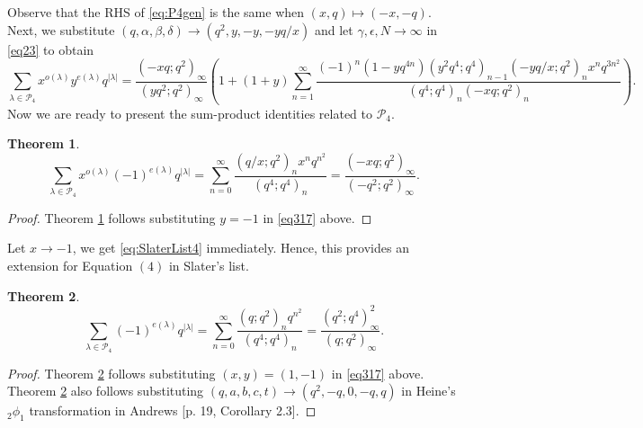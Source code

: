 \documentclass[12pt]{amsart}
\newtheorem{theorem}{Theorem}[section]
\theoremstyle{definition}
\theoremstyle{remark}
\numberwithin{equation}{section}
\begin{document}
Observe that the RHS of \eqref{eq:P4gen} is the same when $(x,q)\mapsto (-x,-q)$. 
Next, we substitute $(q,\alpha,\beta,\delta)\rightarrow (q^2,y,-y,-yq/x)$ and let $\gamma,\epsilon,N\longrightarrow\infty$ in \eqref{eq23} to obtain 
\begin{equation}\label{eq317}
\sum_{\lambda\in\mathcal{P}_4}x^{o(\lambda)}y^{e(\lambda)}q^{|\lambda|}=\frac{(-xq;q^2)_{\infty}}{(yq^2;q^2)_{\infty}}\left(1+(1+y)\sum\limits_{n=1}^{\infty}\frac{(-1)^n(1-yq^{4n})(y^2q^4;q^4)_{n-1}(-yq/x;q^2)_nx^nq^{3n^2}}{(q^4;q^4)_n(-xq;q^2)_n}\right).
\end{equation}
Now we are ready to present the sum-product identities related to $\mathcal{P}_4$.
\begin{theorem}\label{thm36}
\begin{equation}\label{eq319}
\sum_{\lambda\in\mathcal{P}_4}x^{o(\lambda)}(-1)^{e(\lambda)}q^{|\lambda|}=\sum_{n=0}^{\infty}\frac{(q/x;q^2)_{n}x^nq^{n^{2}}}{(q^4;q^4)_{n}}=\frac{(-xq;q^2)_{\infty}}{(-q^2;q^2)_{\infty}}.   
\end{equation}
\end{theorem}
\begin{proof}
Theorem \ref{thm36} follows substituting $y = -1$ in \eqref{eq317} above.    
\end{proof}

Let $x\to-1$, we get \eqref{eq:SlaterList4} immediately. Hence, this provides an extension for Equation $(4)$ in Slater's list. 

\begin{theorem}\label{thm35}
\begin{equation}\label{eq:P4x1y-1}
\sum_{\lambda\in\mathcal{P}_4}(-1)^{e(\lambda)}q^{|\lambda|}=\sum_{n=0}^{\infty}\frac{(q;q^2)_{n}q^{n^{2}}}{(q^4;q^4)_{n}}=\frac{(q^2;q^4)_{\infty}^2}{(q;q^2)_{\infty}}.   
\end{equation}
\end{theorem}
\begin{proof}Theorem \ref{thm35} follows substituting $(x,y) = (1,-1)$ in \eqref{eq317} above. Theorem \ref{thm35} also follows substituting $(q,a,b,c,t)\rightarrow (q^2,-q,0,-q,q)$ in Heine's ${}_2\phi_1$ transformation in Andrews [p. 19, Corollary 2.3].
\end{proof}
\end{document}
